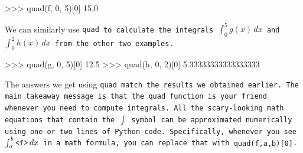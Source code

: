 		\begin{codeblock}[quad-f-0-5]
		>>> quad(f, 0, 5)[0]
		15.0
		\end{codeblock}

		\noindent
		We can similarly use \tt{quad} to calculate the integrals $\int_{0}^5 g(x)\,dx$ and $\int_{0}^2 h(x)\,dx$
		from the other two examples.

		\begin{codeblock}[]
		>>> quad(g, 0, 5)[0]
		12.5
		>>> quad(h, 0, 2)[0]
		5.33333333333333333
		\end{codeblock}

		\noindent
		The answers we get using \tt{quad}
		match the results we obtained earlier.
		The main takeaway message
		is that the \tt{quad} function is your friend whenever you need to compute integrals.
		All the scary-looking math equations that contain the $\int$ symbol
		can be approximated numerically using one or two lines of Python code.
		Specifically,
		whenever you see $\int_a^b \tt{<f>}\,dx$ in a math formula,
		you can replace that with \tt{quad(f,a,b)[0]}.



